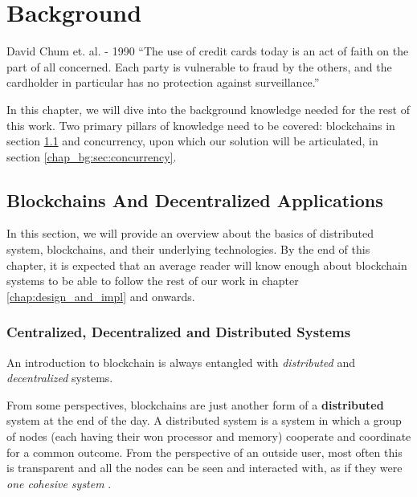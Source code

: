 \chapter{Background} \label{chap:background}


\ifpdf
    \graphicspath{{7/figures/PNG/}{7/figures/PDF/}{7/figures/}}
\else
    \graphicspath{{7/figures/EPS/}{7/figures/}}
\fi
%

\begin{chapquote}{David Chum et. al. - 1990}
``The use of credit cards today is an act of faith on the part of all concerned. Each party is
vulnerable to fraud by the others, and the cardholder in particular has no protection against
surveillance.''
\end{chapquote}


In this chapter, we will dive into the background knowledge needed for the rest of this work. Two
primary pillars of knowledge need to be covered: blockchains in section
\ref{chap_bg:sec:blockchains} and concurrency, upon which our solution will be articulated, in
section \ref{chap_bg:sec:concurrency}.

\section{Blockchains And Decentralized Applications} \label{chap_bg:sec:blockchains}

In this section, we will provide an overview about the basics of distributed system, blockchains,
and their underlying technologies. By the end of this chapter, it is expected that an average reader
will know enough about blockchain systems to be able to follow the rest of our work in chapter
\ref{chap:design_and_impl} and onwards.

\subsection{Centralized, Decentralized and Distributed Systems}

An introduction to blockchain is always entangled with \textit{distributed} and
\textit{decentralized} systems.

From some perspectives, blockchains are just another form of a \textbf{distributed} system at the
end of the day. A distributed system is a system in which a group of nodes (each having their won
processor and memory) cooperate and coordinate for a common outcome. From the perspective of an
outside user, most often this is transparent and all the nodes can be seen and interacted with, as
if they were \textit{one cohesive system} \cite{mastering_blockchain}.

